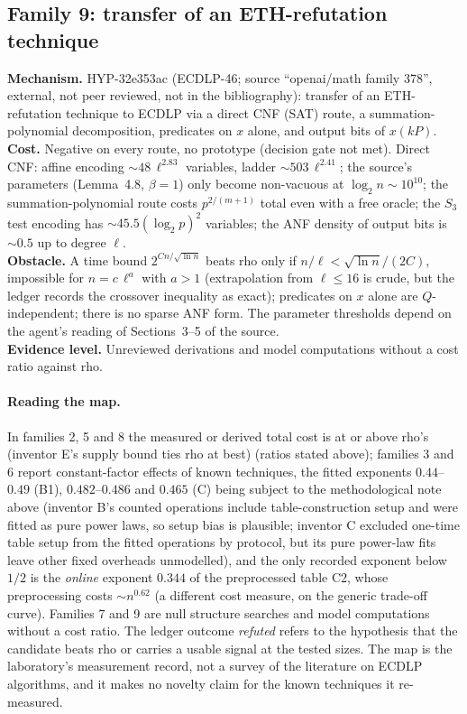 \documentclass[11pt,a4paper]{article}
\theoremstyle{remark}
\begin{document}
\subsection{Family 9: transfer of an ETH-refutation technique}
\textbf{Mechanism.} \mbox{HYP-32e353ac} (ECDLP-46; source ``openai/math family 378'', external, not peer reviewed, not in the bibliography): transfer of an ETH-refutation technique to ECDLP via a direct CNF (SAT) route, a summation-polynomial decomposition, predicates on $x$ alone, and output bits of $x(kP)$. \\
\textbf{Cost.} Negative on every route, no prototype (decision gate not met). Direct CNF: affine encoding $\sim48\,\ell^{2.83}$ variables, ladder $\sim503\,\ell^{2.41}$; the source's parameters (Lemma~4.8, $\beta=1$) only become non-vacuous at $\log_2n\sim10^{10}$; the summation-polynomial route costs $p^{2/(m+1)}$ total even with a free oracle; the $S_3$ test encoding has $\sim45.5(\log_2p)^2$ variables; the ANF density of output bits is $\sim0.5$ up to degree $\ell$.\\
\textbf{Obstacle.} A time bound $2^{Cn/\sqrt{\ln n}}$ beats rho only if $n/\ell<\sqrt{\ln n}/(2C)$, impossible for $n=c\,\ell^{a}$ with $a>1$ (extrapolation from $\ell\le16$ is crude, but the ledger records the crossover inequality as exact); predicates on $x$ alone are $Q$-independent; there is no sparse ANF form. The parameter thresholds depend on the agent's reading of Sections~3--5 of the source.\\
\textbf{Evidence level.} Unreviewed derivations and model computations without a cost ratio against rho.

\paragraph{Reading the map.} In families 2, 5 and 8 the measured or derived total cost is at or above rho's (inventor E's supply bound ties rho at best) (ratios stated above); families 3 and 6 report constant-factor effects of known techniques, the fitted exponents $0.44$--$0.49$ (B1), $0.482$--$0.486$ and $0.465$ (C) being subject to the methodological note above (inventor B's counted operations include table-construction setup and were fitted as pure power laws, so setup bias is plausible; inventor C excluded one-time table setup from the fitted operations by protocol, but its pure power-law fits leave other fixed overheads unmodelled), and the only recorded exponent below $1/2$ is the \emph{online} exponent $0.344$ of the preprocessed table C2, whose preprocessing costs $\sim n^{0.62}$ (a different cost measure, on the generic trade-off curve). Families 7 and 9 are null structure searches and model computations without a cost ratio. The ledger outcome \emph{refuted} refers to the hypothesis that the candidate beats rho or carries a usable signal at the tested sizes. The map is the laboratory's measurement record, not a survey of the literature on ECDLP algorithms, and it makes no novelty claim for the known techniques it re-measured.
\end{document}
